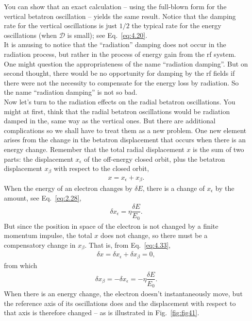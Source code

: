 You can show that an exact calculation -- using the full-blown form for the vertical betatron oscillation -- yields the same result. Notice that the damping rate for the vertical oscillations
 is just $1/2$ the typical rate for the energy oscillations (when $\mathscr{D}$ is small); see Eq.~\eqref{eq:4.20}.\\
It is amusing to notice that the ``radiation'' damping does not occur in the radiation process, but rather in the process of energy gain from the rf system. One might question the appropriateness of the name ``radiation damping''. But on second thought, there would be no opportunity for damping by the rf fields if there were not the necessity to compensate for the energy loss by radiation. So the name ``radiation damping'' is not so bad.\\
Now let’s turn to the radiation effects on the radial betatron oscillations. You might at first,
 think that the radial betatron oscillations would be radiation damped in the, same way as the vertical ones. But there are additional complications so we shall have to treat them as a new problem. One new element arises from the change in the betatron displacement that occurs when there is an energy change. Remember that the total radial displacement $x$ is the sum of two parts: the displacement $x_\epsilon$ of the off-energy closed orbit, plus the betatron displacement $x_\beta$ with respect to the closed orbit,
\begin{align} \label{eq:4.33}
	x = x_\epsilon + x_\beta.
\end{align}
When the energy of an electron changes by $\delta E$, there is a change of $x_\epsilon$ by the
amount, see Eq.~\eqref{eq:2.28},
\begin{align}
	\delta x_\epsilon = \eta \dfrac{\delta E}{E_0}.
\end{align}
But since the position in space of the electron is not changed by a finite momentum impulse,
 the total $x$ does not change, so there must be a compensatory change in $x_\beta$. That is, from Eq.~\eqref{eq:4.33},
\begin{align*}
	\delta x = \delta x_\epsilon + \delta x_\beta = 0,
\end{align*}
from which
\begin{align} \label{eq:4.35}
	\delta x_\beta = -\delta x_\epsilon = -\eta \dfrac{\delta E}{E_0}.
\end{align}
When there is an energy change, the electron doesn't instantaneously move, but the reference
 axis of its oscillations does and the displacement with respect to that axis is therefore changed -- as is illustrated in Fig.~\ref{fig:fig41}.

